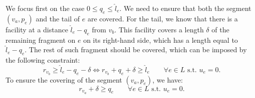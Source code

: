 \documentclass[review]{elsarticle}
\newcommand{\st}{{\text{ s.t. }}}
\newcommand{\dlt}{{\delta}}
\theoremstyle{definition}
\begin{document}
We focus first on the case $0 \le q_{e} \le  \hat l_{e}$. We need to ensure that both the segment $(v_a,p_e)$ and the tail of $e$ are covered.
For the tail, we know that there is a facility at a distance $\hat l_e-q_{e}$ from $v_b$. This facility covers a length $\dlt$ of the remaining fragment on $e$ on its right-hand side, which has a length equal to $ \hat l_{e}-q_{e}$.  The rest of such fragment should be covered, which can be imposed by the following constraint:
  \begin{equation}
  \label{eq.cvu0}
  	r_{v_{b}} \ge \hat l_e-q_{e}-\dlt \iff	r_{v_{b}}+q_{e} + \dlt \ge \hat l_e \qquad \forall e \in L \st u_{e} =0.
  \end{equation}
To ensure the covering of the segment $(v_a,p_e)$, we have:
	\begin{equation}
 	r_{v_{a}}+\dlt \ge q_{e} \qquad  \forall e \in L \st u_{e} =0. \nonumber
  \end{equation}
 
 
\end{document}
